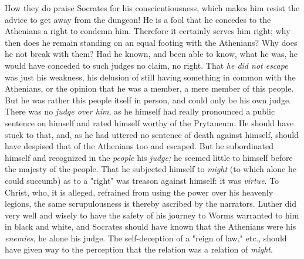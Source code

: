 How they do praise Socrates for his conscientiousness, which makes him resist 
the advice to get away from the dungeon! He is a fool that he concedes to the 
Athenians a right to condemn him. Therefore it certainly serves him right; why 
then does he remain standing on an equal footing with the Athenians? Why does 
he not break with them? Had he known, and been able to know, what he was, he 
would have conceded to such judges no claim, no right. That \textit{he did not 
escape} was just his weakness, his delusion of still having something in 
common with the Athenians, or the opinion that he was a member, a mere member 
of this people. But he was rather this people itself in person, and could only 
be his own judge. There was no \textit{judge over him}, as he himself had 
really pronounced a public sentence on himself and rated himself worthy of the 
Prytaneum. He should have stuck to that, and, as he had uttered no sentence of 
death against himself, should have despised that of the Athenians too and 
escaped. But he subordinated himself and recognized in the \textit{people} his 
\textit{judge;} he seemed little to himself before the majesty of the people. 
That he subjected himself to \textit{might} (to which alone he could succumb) 
as to a "{}right"{} was treason against himself: it was \textit{virtue}. To 
Christ, who, it is alleged, refrained from using the power over his heavenly 
legions, the same scrupulousness is thereby ascribed by the narrators. Luther 
did very well and wisely to have the safety of his journey to Worms warranted 
to him in black and white, and Socrates should have known that the Athenians 
were his \textit{enemies}, he alone his judge. The self-deception of a 
"{}reign of law,"{} etc., should have given way to the perception that the 
relation was a relation of \textit{might}.


